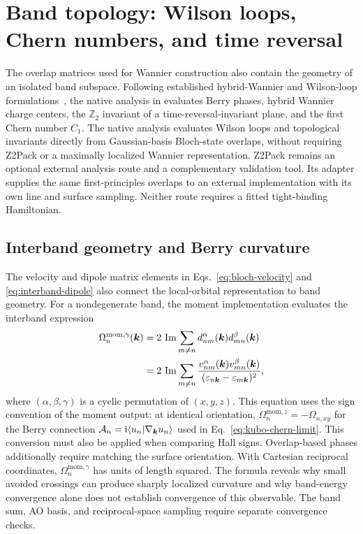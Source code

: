 \section{Band topology: Wilson loops, Chern numbers, and time reversal}
\label{sec:topology}

The overlap matrices used for Wannier construction also contain the geometry
of an isolated band subspace. Following established hybrid-Wannier and
Wilson-loop formulations~\cite{Soluyanov2011,Gresch2017}, the native analysis
in \CPtwoK{} evaluates Berry phases, hybrid Wannier charge centers, the
$\mathbb Z_2$ invariant of a time-reversal-invariant plane, and the first
Chern number $C_1$. The native analysis evaluates Wilson loops and
topological invariants directly from Gaussian-basis Bloch-state overlaps,
without requiring Z2Pack or a maximally localized Wannier representation.
Z2Pack remains an optional external analysis route and a complementary
validation tool. Its adapter supplies the same first-principles overlaps
to an external implementation with its own line and surface sampling.
Neither route requires a fitted tight-binding Hamiltonian.

\subsection{Interband geometry and Berry curvature}
The velocity and dipole matrix elements in
Eqs.~\eqref{eq:bloch-velocity} and \eqref{eq:interband-dipole} also connect
the local-orbital representation to band geometry. For a nondegenerate
band, the moment implementation evaluates the interband expression
\begin{equation}
 \begin{split}
 \Omega^{\mathrm{mom},\gamma}_n(\bm{k})
 &=2\,\operatorname{Im}\sum_{m\ne n}
 d^\alpha_{nm}(\bm{k})d^\beta_{mn}(\bm{k})\\
 &=2\,\operatorname{Im}\sum_{m\ne n}
 \frac{v^\alpha_{nm}(\bm{k})v^\beta_{mn}(\bm{k})}
 {(\varepsilon_{n\bm{k}}-\varepsilon_{m\bm{k}})^2},
 \end{split}
 \label{eq:berry-curvature-dipoles}
\end{equation}
where $(\alpha,\beta,\gamma)$ is a cyclic permutation of $(x,y,z)$.
This equation uses the sign convention of the moment output:
at identical orientation, $\Omega^{\mathrm{mom},z}_n=-\Omega_{n,xy}$
for the Berry connection $\mathcal A_n=\mathrm{i}\langle u_n|\nabla_{\bm{k}}u_n\rangle$
used in Eq.~\eqref{eq:kubo-chern-limit}. This conversion must also be
applied when comparing Hall signs. Overlap-based phases additionally
require matching the surface orientation. With Cartesian reciprocal
coordinates, $\Omega^{\mathrm{mom},\gamma}_n$ has units of length squared. The formula reveals why
small avoided crossings can produce sharply localized curvature and why
band-energy convergence alone does not establish convergence of this
observable. The band sum, AO basis, and reciprocal-space sampling require
separate convergence checks.

